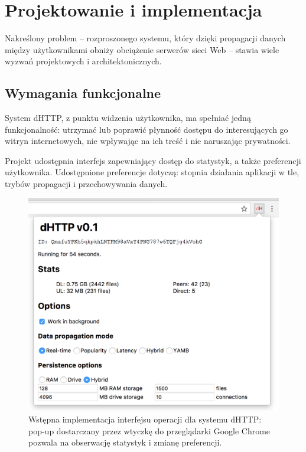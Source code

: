 \chapter{Projektowanie i implementacja}
\label{cha:implementacja}

Nakreślony problem -- rozproszonego systemu, który dzięki propagacji danych między użytkownikami obniży obciążenie serwerów sieci Web -- stawia wiele wyzwań projektowych i architektonicznych.

\section{Wymagania funkcjonalne}
\label{sec:funkcjonalnosc}

System dHTTP, z punktu widzenia użytkownika, ma spełniać jedną funkcjonalność: utrzymać lub poprawić płynność dostępu do interesujących go witryn internetowych, nie wpływając na ich treść i nie naruszając prywatności.

Projekt udostępnia interfejs zapewniający dostęp do statystyk, a także preferencji użytkownika. Udostępnione preferencje dotyczą: stopnia działania aplikacji w tle, trybów propagacji i przechowywania danych.

\begin{figure}[h]
	\centering
    \includegraphics[scale=0.5]{dhttp-initial-interface.png}
	
	\caption{\label{fig:initialInterface} Wstępna implementacja interfejsu operacji dla systemu dHTTP: pop-up dostarczany przez wtyczkę do przeglądarki Google Chrome pozwala na obserwację statystyk i zmianę preferencji.}
\end{figure}

